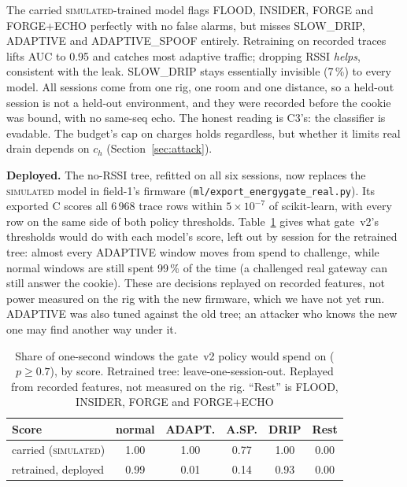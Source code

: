 \documentclass[conference]{IEEEtran}
\newcommand{\simu}{\textsc{simulated}}
\begin{document}
The carried \simu-trained model flags FLOOD, INSIDER, FORGE and FORGE+ECHO perfectly with no false alarms, but misses
SLOW\_DRIP, ADAPTIVE and ADAPTIVE\_SPOOF entirely. Retraining on recorded traces lifts AUC to 0.95 and catches most
adaptive traffic; dropping RSSI \emph{helps}, consistent with the leak. SLOW\_DRIP stays essentially invisible
(7\,\%) to every model. All sessions come from one rig, one room and one distance, so a held-out session is not a
held-out environment, and they were recorded before the cookie was bound, with no same-seq echo. The honest reading
is C3's: the classifier is evadable. The budget's cap on charges holds regardless, but whether it limits real drain
depends on $c_h$ (Section~\ref{sec:attack}).

\textbf{Deployed.} The no-RSSI tree, refitted on all six sessions, now replaces the \simu{} model in field-1's
firmware (\texttt{ml/export\_energygate\_real.py}). Its exported C scores all 6\,968 trace rows within
$5\times10^{-7}$ of scikit-learn, with every row on the same side of both policy thresholds. Table~\ref{tab:deploy}
gives what gate~v2's thresholds would do with each model's score, left out by session for the retrained tree: almost
every ADAPTIVE window moves from spend to challenge, while normal windows are still spent 99\,\% of the time (a
challenged real gateway can still answer the cookie). These are decisions replayed on recorded features, not power
measured on the rig with the new firmware, which we have not yet run. ADAPTIVE was also tuned against the old tree;
an attacker who knows the new one may find another way under it.

\begin{table}[t]
\caption{Share of one-second windows the gate~v2 policy would spend on ($p\ge0.7$), by score. Retrained tree:
leave-one-session-out. Replayed from recorded features, not measured on the rig. ``Rest'' is FLOOD, INSIDER, FORGE
and FORGE+ECHO}
\label{tab:deploy}
\centering\footnotesize
\setlength{\tabcolsep}{3pt}
\begin{tabular}{lccccc}
\toprule
Score & normal & ADAPT. & A.SP. & DRIP & Rest\\
\midrule
carried (\simu) & 1.00 & 1.00 & 0.77 & 1.00 & 0.00\\
retrained, deployed & 0.99 & 0.01 & 0.14 & 0.93 & 0.00\\
\bottomrule
\end{tabular}
\end{table}

\end{document}
